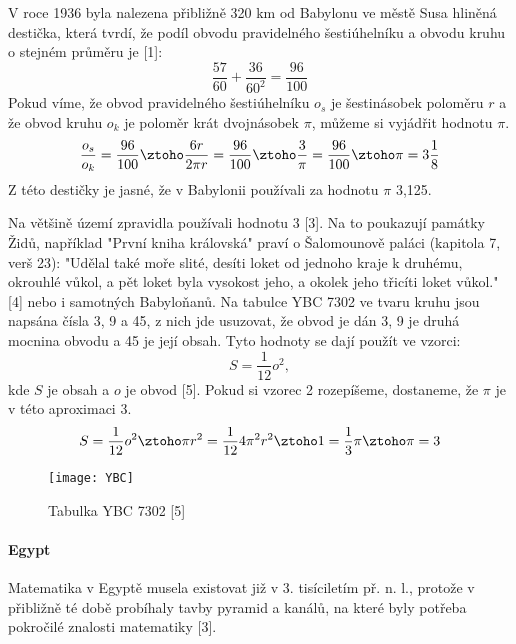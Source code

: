 \documentclass[soc]{gzwroc} %
\begin{document}
V roce 1936 byla nalezena přibližně 320 km od Babylonu ve městě Susa hliněná destička, která tvrdí, že podíl obvodu pravidelného šestiúhelníku a obvodu kruhu o stejném průměru je [1]:
$$
\frac{57}{60}+\frac{36}{60^2}=\frac{96}{100}
$$
Pokud víme, že obvod pravidelného šestiúhelníku $o_s$ je šestinásobek poloměru $r$ a že obvod kruhu $o_k$ je poloměr krát dvojnásobek $\pi$, můžeme si vyjádřit hodnotu $\pi$.
\begin{equation}
\frac{o_s}{o_k}=\frac{96}{100} \ztoho \frac{6r}{2\pi r}=\frac{96}{100} \ztoho \frac{3}{\pi}=\frac{96}{100} \ztoho\pi=3\frac{1}{8}
\end{equation}
Z této destičky je jasné, že v Babylonii používali za hodnotu $\pi$ 3,125.

Na většině území zpravidla používali hodnotu 3 [3]. Na to poukazují památky Židů, například "První kniha královská" praví o Šalomounově paláci (kapitola 7, verš 23): "Udělal také moře slité, desíti loket od jednoho kraje k druhému, okrouhlé vůkol, a pět loket byla vysokost jeho, a okolek jeho třicíti loket vůkol." [4] nebo i samotných Babyloňanů. Na tabulce YBC 7302 ve tvaru kruhu jsou napsána čísla 3, 9 a 45, z nich jde usuzovat, že obvod je dán 3, 9 je druhá mocnina obvodu a 45 je její obsah. Tyto hodnoty se dají použít ve vzorci:
\begin{equation}
S=\frac{1}{12}o^2,
\end{equation}
kde $S$ je obsah a $o$ je obvod [5]. Pokud si vzorec 2 rozepíšeme, dostaneme, že $\pi$ je v této aproximaci 3.
$$
S=\frac{1}{12}o^2 \ztoho \pi r^2=\frac{1}{12}4\pi^2r^2 \ztoho 1=\frac{1}{3}\pi \ztoho \pi=3
$$
\begin{figure}[!ht]
\texttt{[image: YBC]}
\caption{Tabulka YBC 7302 [5]}
\label{fig:kruh}
\end{figure}
\paragraph{Egypt}
Matematika v Egyptě musela existovat již v 3. tisíciletím př. n. l., protože v přibližně té době probíhaly tavby pyramid a kanálů, na které byly potřeba pokročilé znalosti matematiky [3].
\end{document}
